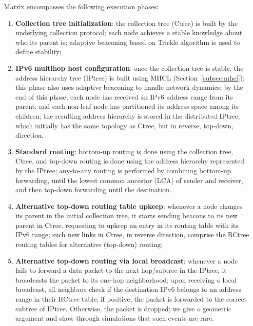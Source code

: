 Matrix encompasses the following execution phases:
\begin{enumerate}
    \item \textbf{Collection tree initialization}: the collection tree (Ctree) is built by the underlying collection protocol; each node achieves a stable knowledge about who its parent is; adaptive beaconing based on Trickle algorithm \cite{Levis:2004} is used to define stability;

    \item \textbf{IPv6 multihop host configuration}: once the collection tree is stable, the address hierarchy tree (IPtree) is built using MHCL (Section~\ref{subsec:mhcl}); this phase also uses adaptive beaconing to handle network   dynamics; by the end of this phase, each node has received an IPv6 address range from its parent, and each non-leaf node has partitioned its address space among its children; the resulting address hierarchy is stored in the distributed IPtree, which initially has the same topology as Ctree, but in reverse, top-down, direction.

    \item \textbf{Standard routing}: bottom-up routing is done using the collection tree, Ctree, and top-down routing is done using the address hierarchy represented by the IPtree; any-to-any routing is performed by combining bottom-up forwarding, until the lowest common ancestor (LCA) of sender and receiver, and then top-down forwarding until the destination.

    \item \textbf{Alternative top-down routing table upkeep}: whenever a node changes its parent in the initial collection tree, it starts sending beacons to its new parent in Ctree, requesting to upkeep an entry in its routing table with its IPv6 range; such new links in Ctree, in reverse direction, comprise the RCtree routing tables for alternative (top-down) routing;

    \item \textbf{Alternative top-down routing via local broadcast}: whenever a node fails to forward a data packet to the next hop/subtree in the IPtree, it broadcasts the packet to its one-hop neighborhood; upon receiving a local broadcast, all neighbors check if the destination IPv6 belongs to an address range in their RCtree table; if positive, the packet is forwarded to the correct subtree of IPtree. Otherwise, the packet is dropped; we give a geometric argument and show through simulations that such events are rare.
\end{enumerate}

